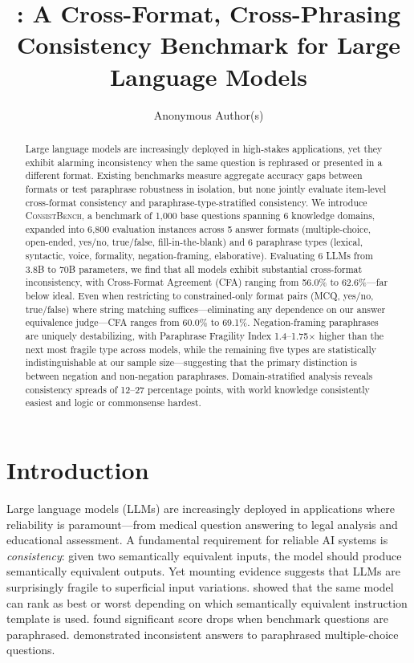 \documentclass{article}
\title{\consistbench{}: A Cross-Format, Cross-Phrasing Consistency Benchmark for Large Language Models}
\author{
  Anonymous Author(s)
}
\newcommand{\consistbench}{\textsc{ConsistBench}}
\begin{document}
\maketitle

\begin{abstract}
Large language models are increasingly deployed in high-stakes applications, yet they exhibit alarming inconsistency when the same question is rephrased or presented in a different format. Existing benchmarks measure aggregate accuracy gaps between formats or test paraphrase robustness in isolation, but none jointly evaluate item-level cross-format consistency and paraphrase-type-stratified consistency. We introduce \consistbench{}, a benchmark of 1,000 base questions spanning 6 knowledge domains, expanded into 6,800 evaluation instances across 5 answer formats (multiple-choice, open-ended, yes/no, true/false, fill-in-the-blank) and 6 paraphrase types (lexical, syntactic, voice, formality, negation-framing, elaborative). Evaluating 6 LLMs from 3.8B to 70B parameters, we find that all models exhibit substantial cross-format inconsistency, with Cross-Format Agreement (CFA) ranging from 56.0\% to 62.6\%---far below ideal. Even when restricting to constrained-only format pairs (MCQ, yes/no, true/false) where string matching suffices---eliminating any dependence on our answer equivalence judge---CFA ranges from 60.0\% to 69.1\%. Negation-framing paraphrases are uniquely destabilizing, with Paraphrase Fragility Index 1.4--1.75$\times$ higher than the next most fragile type across models, while the remaining five types are statistically indistinguishable at our sample size---suggesting that the primary distinction is between negation and non-negation paraphrases. Domain-stratified analysis reveals consistency spreads of 12--27 percentage points, with world knowledge consistently easiest and logic or commonsense hardest.
\end{abstract}

\section{Introduction}

Large language models (LLMs) are increasingly deployed in applications where reliability is paramount---from medical question answering to legal analysis and educational assessment. A fundamental requirement for reliable AI systems is \emph{consistency}: given two semantically equivalent inputs, the model should produce semantically equivalent outputs. Yet mounting evidence suggests that LLMs are surprisingly fragile to superficial input variations. \citet{mizrahi2024state} showed that the same model can rank as best or worst depending on which semantically equivalent instruction template is used. \citet{lunardi2025robustness} found significant score drops when benchmark questions are paraphrased. \citet{choi2025roparq} demonstrated inconsistent answers to paraphrased multiple-choice questions.
\end{document}
